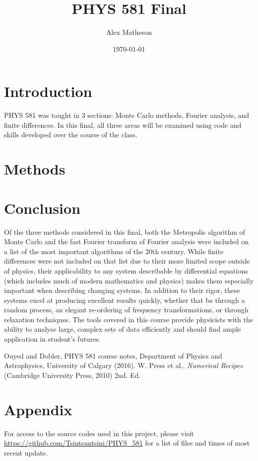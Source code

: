 \documentclass[twocolumn]{article}
\begin{document}
\title{PHYS 581 Final}
\author{Alex Matheson}
\date{\today}
\maketitle

\section{Introduction}
PHYS 581 was taught in 3 sections: Monte Carlo methods, Fourier analysis, and finite differences. In this final, all three areas will be examined using code and skills developed over the course of the class. 

\section{Methods}

\section{Conclusion}
Of the three methods considered in this final, both the Metropolis algorithm of Monte Carlo and the fast Fourier transform of Fourier analysis were included on a list of the most important algorithms of the 20th century. While finite differences were not included on that list due to their more limited scope outside of physics, their applicability to any system describable by differential equations (which includes much of modern mathematics and physics) makes them especially important when describing changing systems. In addition to their rigor, these systems excel at producing excellent results quickly, whether that be through a random process, an elegant re-ordering of frequency transformations, or through relaxation techniques. The tools covered in this course provide physicists with the ability to analyse large, complex sets of data efficiently and should find ample application in student's futures.

\begin{thebibliography}{00}
	Ouyed and Dobler, PHYS 581 course notes, Department of Physics and Astrophysics, University of Calgary (2016).
	W. Press et al., \emph{Numerical Recipes} (Cambridge University Press, 2010) 2nd. Ed.
\end{thebibliography}

\section{Appendix}
For access to the source codes used in this project, please visit \url{https://github.com/Tsintsuntsini/PHYS_581} for a list of files and times of most recent update.
\end{document}
